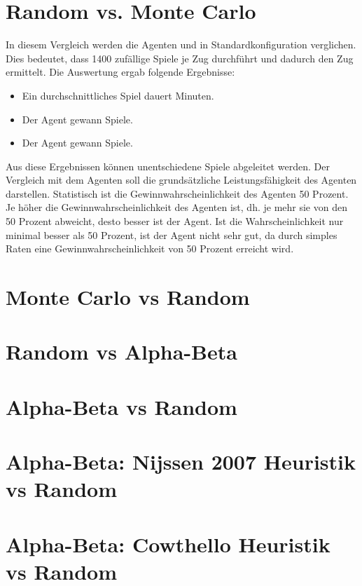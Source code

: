 \section{Random vs. Monte Carlo}
In diesem Vergleich werden die Agenten  und  in Standardkonfiguration verglichen. Dies bedeutet, dass  1400 zufällige Spiele je Zug durchführt und dadurch den  Zug ermittelt.
Die Auswertung ergab folgende Ergebnisse:
\begin{itemize}
\item Ein durchschnittliches Spiel dauert Minuten.
\item Der Agent  gewann Spiele.
\item Der Agent  gewann Spiele.
\end{itemize}
Aus diese Ergebnissen können unentschiedene Spiele abgeleitet werden. Der Vergleich mit dem  Agenten soll die grundsätzliche Leistungsfähigkeit des Agenten darstellen. Statistisch ist die Gewinnwahrscheinlichkeit des  Agenten 50 Prozent. Je höher die Gewinnwahrscheinlichkeit des  Agenten ist, dh. je mehr sie von den 50 Prozent abweicht, desto besser ist der Agent. Ist die Wahrscheinlichkeit nur minimal besser als 50 Prozent, ist der Agent nicht sehr gut, da durch simples Raten eine Gewinnwahrscheinlichkeit von 50 Prozent erreicht wird.
\section{Monte Carlo vs Random}

\section{Random vs Alpha-Beta}

\section{Alpha-Beta vs Random}

\section{Alpha-Beta: Nijssen 2007 Heuristik vs Random}

\section{Alpha-Beta: Cowthello Heuristik vs Random}

